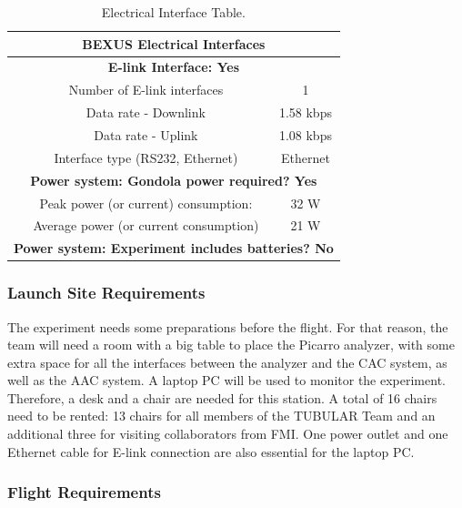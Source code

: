 \documentclass[a4paper,12pt,twoside]{article}
\begin{document}
\begin{table}[H]
\centering
\begin{tabular}{|c|c|c|}
\hline
\multicolumn{3}{|c|}{\textbf{BEXUS Electrical Interfaces}}                     \\ \hline
\multicolumn{3}{|c|}{\textbf{E-link Interface: Yes}}                           \\ \hline
\multirow{4}{*}{}    & Number of E-link interfaces               & 1           \\ \cline{2-3} 
                     & Data rate - Downlink                      & 1.58 kbps     \\ \cline{2-3} 
                     & Data rate - Uplink                        & 1.08 kbps      \\ \cline{2-3} 
                     & Interface type (RS232, Ethernet)          & Ethernet    \\ \hline
\multicolumn{3}{|c|}{\textbf{Power system: Gondola power required? Yes}}       \\ \hline
\multirow{2}{*}{}    & Peak power (or current) consumption:      & 32 W            \\ \cline{2-3} 
                     & Average power (or current consumption)    & 21 W            \\ \hline
\multicolumn{3}{|l|}{\textbf{Power system: Experiment includes batteries? No}} \\ \hline
\end{tabular}
\caption{Electrical Interface Table.}
\label{tab:electrical-interface-table}
\end{table}
\raggedbottom

\subsubsection{Launch Site Requirements}
The experiment needs some preparations before the flight. For that reason, the team will need a room with a big table to place the Picarro analyzer, with some extra space for all the interfaces between the analyzer and the CAC system, as well as the AAC system.
A laptop PC will be used to monitor the experiment. Therefore, a desk and a chair are needed for this station. A total of 16 chairs need to be rented: 13 chairs for all members of the TUBULAR Team and an additional three for visiting collaborators from FMI. One power outlet and one Ethernet cable for E-link connection are also essential for the laptop PC.

\subsubsection{Flight Requirements}
\end{document}
